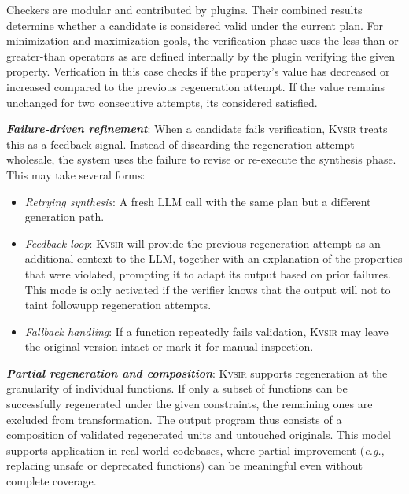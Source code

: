 \documentclass[sigplan]{acmart}
\def\eg{{\em e.g.}, }
\newcommand{\sys}{{\scshape Kv{\textalpha}sir}\xspace}
\newcommand{\heading}[1]{\vspace{2pt}\noindent\textbf{\emph{#1}}:\enspace}
\begin{document}
Checkers are modular and contributed by plugins. Their combined results determine whether a candidate is considered valid under the current plan.
For minimization and maximization goals, the verification phase uses the less-than or greater-than operators as are defined internally by the plugin verifying the given property.
Verfication in this case checks if the property's value has decreased or increased compared 
to the previous regeneration attempt. If the value remains unchanged for two consecutive attempts, its considered satisfied.

\heading{Failure-driven refinement}
When a candidate fails verification, \sys treats this as a feedback signal. Instead of discarding the regeneration attempt wholesale, the system uses the failure to revise or re-execute the synthesis phase. This may take several forms:
\begin{itemize}
  \item \emph{Retrying synthesis}: A fresh LLM call with the same plan but a different generation path.
  \item \emph{Feedback loop}: \sys will provide the previous regeneration attempt 
    as an additional context to the LLM, together with an explanation of the properties that were violated, prompting it to adapt its output based on prior failures.
    This mode is only activated if the verifier knows that the output will not to taint
    followupp regeneration attempts.
  \item \emph{Fallback handling}: If a function repeatedly fails validation, \sys may leave the original version intact or mark it for manual inspection.
\end{itemize}


\heading{Partial regeneration and composition}
\sys supports regeneration at the granularity of individual functions. If only a subset of functions can be successfully regenerated under the given constraints, the remaining ones are excluded from transformation.
The output program thus consists of a composition of validated regenerated units and untouched originals.
This model supports application in real-world codebases, where partial improvement (\eg replacing unsafe or deprecated functions) can be meaningful even without complete coverage.

\end{document}
